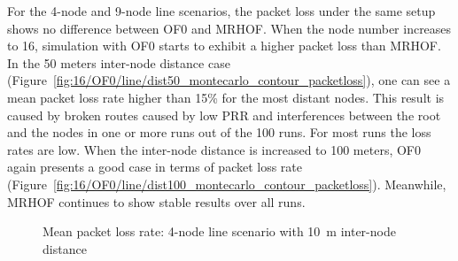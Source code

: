 For the 4-node and 9-node line scenarios, the packet loss under the same setup shows no difference between OF0 and MRHOF. When the node number increases to 16, simulation with OF0 starts to exhibit a higher packet loss than MRHOF. In the 50 meters inter-node distance case (Figure~\ref{fig:16/OF0/line/dist50_montecarlo_contour_packetloss}), one can see a mean packet loss rate higher than 15\% for the most distant nodes. This result is caused by broken routes caused by low PRR and interferences between the root and the nodes in one or more runs out of the 100 runs. For most runs the loss rates are low. When the inter-node distance is increased to 100 meters, OF0 again presents a good case in terms of packet loss rate (Figure~\ref{fig:16/OF0/line/dist100_montecarlo_contour_packetloss}). Meanwhile, MRHOF continues to show stable results over all runs.
\begin{figure}[p]
  \centering
    \leavevmode
   \caption{Mean packet loss rate: 4-node line scenario with 10~m inter-node distance}
   \label{fig:pl_4_line_10}
   \vspace{-20pt}
\end{figure}

